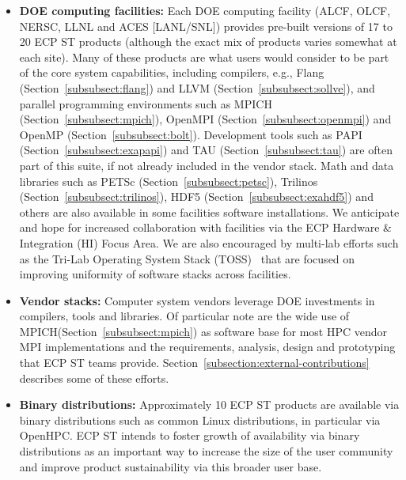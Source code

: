 \begin{itemize}
	\item \textbf{DOE computing facilities:} Each DOE computing facility (ALCF, OLCF, NERSC, LLNL and ACES [LANL/SNL]) provides pre-built versions of 17 to 20 ECP ST products (although the exact mix of products varies somewhat at each site).  Many of these products are what users would consider to be part of the core system capabilities, including compilers, e.g., Flang (Section~\ref{subsubsect:flang}) and LLVM (Section~\ref{subsubsect:sollve}), and parallel programming environments such as MPICH (Section~\ref{subsubsect:mpich}), OpenMPI (Section~\ref{subsubsect:openmpi}) and OpenMP (Section~\ref{subsubsect:bolt}).  Development tools such as PAPI (Section~\ref{subsubsect:exapapi}) and TAU (Section~\ref{subsubsect:tau}) are often part of this suite, if not already included in the vendor stack. Math and data libraries such as PETSc (Section~\ref{subsubsect:petsc}), Trilinos (Section~\ref{subsubsect:trilinos}), HDF5 (Section~\ref{subsubsect:exahdf5}) and others are also available in some facilities software installations.  We anticipate and hope for increased collaboration with facilities via the ECP Hardware \& Integration (HI) Focus Area.  We are also encouraged by multi-lab efforts such as the Tri-Lab Operating System Stack (TOSS)~\cite{TOSS} that are focused on improving uniformity of software stacks across facilities.
	\item \textbf{Vendor stacks:} Computer system vendors leverage DOE investments in compilers, tools and libraries.  Of particular note are the wide use of MPICH(Section~\ref{subsubsect:mpich}) as software base for most HPC vendor MPI implementations and the requirements, analysis, design and prototyping that ECP ST teams provide.  Section~\ref{subsection:external-contributions} describes some of these efforts.
	\item \textbf{Binary distributions:} Approximately 10 ECP ST products are available via binary distributions such as common Linux distributions, in particular via OpenHPC\cite{OpenHPC}.  ECP ST intends to foster growth of availability via binary distributions as an important way to increase the size of the user community and improve product sustainability via this broader user base.
\end{itemize}

